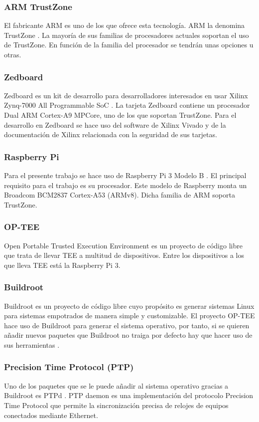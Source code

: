 \subsubsection{ARM TrustZone}
El fabricante ARM es uno de los que ofrece esta tecnología. ARM la denomina TrustZone \cite{trustzone}. La mayoría de sus familias de procesadores actuales soportan el uso de TrustZone. En función de la familia del procesador se tendrán unas opciones u otras.

\subsubsection{Zedboard}
Zedboard es un kit de desarrollo para desarrolladores interesados en usar Xilinx Zynq-7000 All Programmable SoC \cite{zedboard}. La tarjeta Zedboard contiene un procesador Dual ARM Cortex-A9 MPCore, uno de los que soportan TrustZone. Para el desarrollo en Zedboard se hace uso del software de Xilinx Vivado y de la documentación de Xilinx relacionada con la seguridad de sus tarjetas.

\subsubsection{Raspberry Pi}
Para el presente trabajo se hace uso de Raspberry Pi 3 Modelo B \cite{rpi}. El principal requisito para el trabajo es su procesador. Este modelo de Raspberry monta un Broadcom BCM2837 Cortex-A53 (ARMv8). Dicha familia de ARM soporta TrustZone.

\subsubsection{OP-TEE}
Open Portable Trusted Execution Environment \cite{optee} es un proyecto de código libre que trata de llevar TEE a multitud de dispositivos. Entre los dispositivos a los que lleva TEE está la Raspberry Pi 3.

\subsubsection{Buildroot}
Buildroot es un proyecto de código libre cuyo propósito es generar sistemas Linux para sistemas empotrados de manera simple y customizable. El proyecto OP-TEE hace uso de Buildroot para generar el sistema operativo, por tanto, si se quieren añadir nuevos paquetes que Buildroot no traiga por defecto hay que hacer uso de sus herramientas \cite{buildroot}.

\subsubsection{Precision Time Protocol (PTP)}
Uno de los paquetes que se le puede añadir al sistema operativo gracias a Buildroot es PTPd \cite{ptpd}. PTP daemon es una implementación del protocolo Precision Time Protocol que permite la sincronización precisa de relojes de equipos conectados mediante Ethernet.

